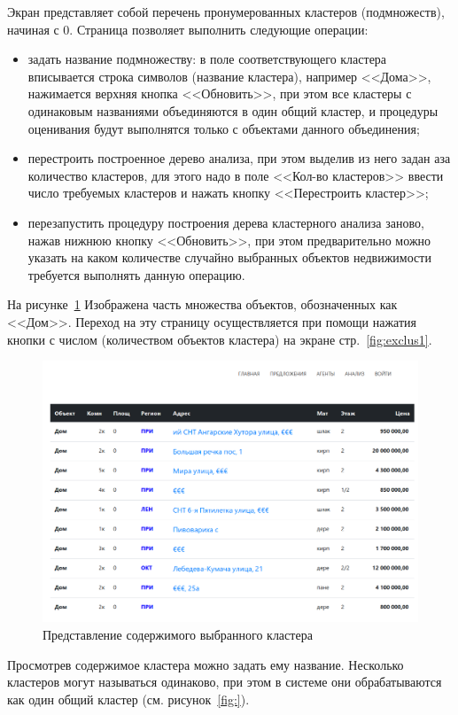 \documentclass[a4paper,14pt,openany,final]{extreport} %
\def\oldcaption{} \let\oldcaption=\caption
\def\caption{\stepcounter{captionsnum}\oldcaption}
\begin{document}
{Экран представляет собой перечень пронумерованных кластеров (подмножеств), начиная с 0.  Страница позволяет выполнить следующие операции:
\begin{itemize}
\item задать название подмножеству: в поле соответствующего кластера вписывается строка символов (название кластера), например <<Дома>>, нажимается верхняя кнопка <<Обновить>>, при этом все кластеры с одинаковым названиями объединяются в один общий кластер, и процедуры оценивания будут выполнятся только с объектами данного объединения;
\item перестроить построенное дерево анализа, при этом выделив из него задан аза количество кластеров, для этого надо в поле <<Кол-во кластеров>> ввести число требуемых кластеров и нажать кнопку <<Перестроить кластер>>;
\item перезапустить процедуру построения дерева кластерного анализа заново, нажав нижнюю кнопку <<Обновить>>, при этом предварительно можно указать на каком количестве случайно выбранных объектов недвижимости требуется выполнять данную операцию.
\end{itemize}

На рисунке~\ref{fig:cluscontent} Изображена часть множества объектов, обозначенных как <<Дом>>. Переход на эту страницу осуществляется при помощи нажатия кнопки с числом (количеством объектов кластера) на экране стр.~\ref{fig:exclus1}.

\begin{figure}[htbp]
  \centering
  \includegraphics[width=0.8\linewidth]{screen-cluster-content.png}
  \caption{Представление содержимого выбранного кластера}
  \label{fig:cluscontent}
\end{figure}

Просмотрев содержимое кластера можно задать ему название. Несколько кластеров могут называться одинаково, при этом в системе они обрабатываются как один общий кластер (см. рисунок~\ref{fig:}).

}
\end{document}
